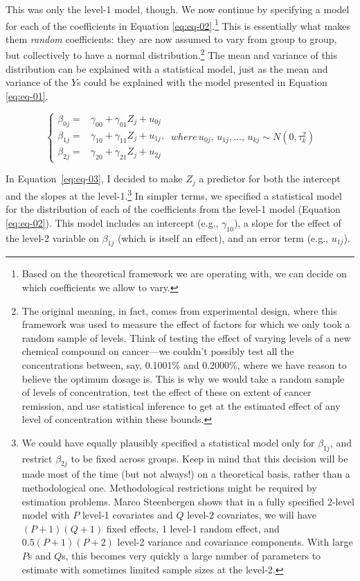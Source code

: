 \documentclass[12pt,english]{article}\usepackage[]{graphicx}\usepackage[usenames, dvipsnames]{xcolor}
\begin{document}
This was only the level-1 model, though. We now continue by specifying a model for each of the coefficients in Equation \ref{eq:eq-02}.\footnote{Based on the theoretical framework we are operating with, we can decide on which coefficients we allow to vary.} This is essentially what makes them \textit{random} coefficients: they are now assumed to vary from group to group, but collectively to have a normal distribution.\footnote{The original meaning, in fact, comes from experimental design, where this framework was used to measure the effect of factors for which we only took a random sample of levels. Think of testing the effect of varying levels of a new chemical compound on cancer---we couldn't possibly test all the concentrations between, say, 0.1001\% and 0.2000\%, where we have reason to believe the optimum dosage is. This is why we would take a random sample of levels of concentration, test the effect of these on extent of cancer remission, and use statistical inference to get at the estimated effect of any level of concentration within these bounds.} The mean and variance of this distribution can be explained with a statistical model, just as the mean and variance of the $Y$s could be explained with the model presented in Equation \ref{eq:eq-01}.

\begin{equation}
\begin{cases}
\beta_{0j}= & \gamma_{00}+\gamma_{01}Z_{j}+u_{0j}\\
\beta_{1j}= & \gamma_{10}+\gamma_{11}Z_{j}+u_{1j},\\
\beta_{2j}= & \gamma_{20}+\gamma_{21}Z_{j}+u_{2j}
\end{cases}\, where\, u_{0j},\, u_{1j},\ldots,\, u_{kj}\sim N(0,\tau_{k}^{2})
\label{eq:eq-03}
\end{equation}

In Equation~\ref{eq:eq-03}, I decided to make $Z_j$ a predictor for both the intercept and the slopes at the level-1.\footnote{We could have equally plausibly specified a statistical model only for $\beta_{1j}$, and restrict $\beta_{2j}$ to be fixed across groups. Keep in mind that this decision will be made most of the time (but not always!) on a theoretical basis, rather than a methodological one. Methodological restrictions might be required by estimation problems. Marco Steenbergen shows that in a fully specified 2-level model with $P$ level-1 covariates and $Q$ level-2 covariates, we will have $(P+1)(Q+1)$ fixed effects, 1 level-1 random effect, and $0.5(P+1)(P+2)$ level-2 variance and covariance components. With large $P$s and $Q$s, this becomes very quickly a large number of parameters to estimate with sometimes limited sample sizes at the level-2.} In simpler terms, we specified a statistical model for the distribution of each of the coefficients from the level-1 model (Equation \ref{eq:eq-02}). This model includes an intercept (e.g., $\gamma_{10}$), a slope for the effect of the level-2 variable on $\beta_{1j}$ (which is itself an effect), and an error term (e.g., $u_{1j}$).
\end{document}
